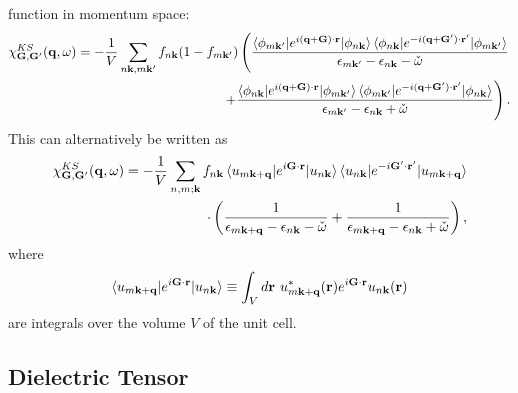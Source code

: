 \begin{refsection}
function in momentum space: 
\begin{equation} 
\begin{aligned} 
\chi_{\mathbf{G},\mathbf{G}'}^{KS}(\mathbf{q},\omega) = - \frac{1}{V} 
\sum_{n\mathbf{k},m\mathbf{k}'} f_{n\mathbf{k}} (1 - f_{m\mathbf{k}'}) 
\left( \frac{\braket{\phi_{m\mathbf{k}'} | 
e^{i(\mathbf{q}+\mathbf{G})\cdot\mathbf{r}} 
|\phi_{n\mathbf{k}}}\braket{\phi_{n\mathbf{k}} | 
e^{-i(\mathbf{q}+\mathbf{G}')\cdot\mathbf{r}'} 
|\phi_{m\mathbf{k}'}}}{\epsilon_{m\mathbf{k}'} - \epsilon_{n\mathbf{k}} - 
\check{\omega}}\right. \\ \left. + \frac{\braket{\phi_{n\mathbf{k}} | 
e^{i(\mathbf{q}+\mathbf{G})\cdot\mathbf{r}} 
|\phi_{m\mathbf{k}'}}\braket{\phi_{m\mathbf{k}'} | 
e^{-i(\mathbf{q}+\mathbf{G}')\cdot\mathbf{r}'} 
|\phi_{n\mathbf{k}}}}{\epsilon_{m\mathbf{k}'} - \epsilon_{n\mathbf{k}} + 
\check{\omega}}\right). 
\end{aligned} 
\end{equation} 
This can alternatively be written as~\cite{Harl2008} 
\begin{equation} \label{dft:eq-Fresponse} 
\begin{aligned} 
\chi_{\mathbf{G},\mathbf{G}'}^{KS}(\mathbf{q},\omega) = - \frac{1}{V} 
\sum_{n,m ; \mathbf{k}} f_{n\mathbf{k}} \braket{u_{m\mathbf{k+q}} | 
e^{i\mathbf{G}\cdot\mathbf{r}} | u_{n\mathbf{k}}} \braket{u_{n\mathbf{k}} | 
e^{-i\mathbf{G}'\cdot\mathbf{r}'} | u_{m\mathbf{k+q}}}\\ \cdot \left( 
\frac{1}{\epsilon_{m\mathbf{k+q}} - \epsilon_{n\mathbf{k}} - \check{\omega}} + 
\frac{1}{\epsilon_{m\mathbf{k+q}} - \epsilon_{n\mathbf{k}} + 
\check{\omega}}\right), 
\end{aligned} 
\vspace{0.2in} 
\end{equation} 
where 
\begin{equation} 
\braket{u_{m\mathbf{k+q}} | e^{i\mathbf{G}\cdot\mathbf{r}} | u_{n\mathbf{k}}} 
\equiv \int_V d\mathbf{r} \hspace{0.05in} u_{m\mathbf{k+q}}^*(\mathbf{r}) 
e^{i\mathbf{G}\cdot\mathbf{r}} u_{n\mathbf{k}}(\mathbf{r}) 
\end{equation} 
are integrals over the volume $V$ of the unit cell. 
 
\subsection{Dielectric Tensor} \label{dft:sec-dielectric} 
 

\end{refsection}
